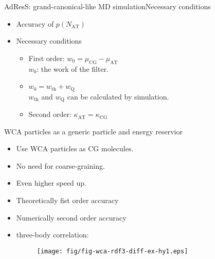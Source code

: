 \documentclass{beamer}
\newcommand{\redc}[1]{{\color{red} #1}}
\newcommand{\bluec}[1]{{\color{blue} #1}}
\newcommand{\AT}{{\textrm{{AT}}}}
\newcommand{\CG}{{\textrm{CG}}}
\newcommand{\thf}{{\textrm{th}}}
\begin{document}
\begin{frame}{AdResS: grand-canonical-like MD simulation}{Necessary conditions}
  \begin{itemize}
    \vfill
  \item<1-> Accuracy of \bluec{$p(N_\AT) $}
    \vfill
  \item<2-> Necessary conditions
    \begin{itemize}
    \vfill
    \item<3-> First order: \redc{$ w_0 = \mu_{\CG} - \mu_{\AT}$}\\
      $w_0$: the work of the filter.
      \vfill
    \item <4-> \redc{$ w_0 = w_\thf + w_{\textrm{Q}}$}\\
      $w_\thf$ and $w_{\textrm{Q}}$ can be calculated by simulation.
    \vfill
    \item<5-> Second order: \redc{$\kappa_\AT = \kappa_{\CG}$}
    \end{itemize}
    \vfill
  \end{itemize}  
\end{frame}




\begin{frame}{WCA particles as a generic particle and energy reservior}
  \begin{itemize}
  \item<1-> Use WCA particles as CG molecules. 
  \item<2-> No need for coarse-graining.
  \item<3-> Even higher speed up.
  \item<4-> Theoretically fist order accuracy
  \item<5-> Numerically second order accuracy
  \item<6-> three-body correlation:
  \begin{figure}
    \centering 
    \texttt{[image: fig/fig-wca-rdf3-diff-ex-hy1.eps]}
  \end{figure}    
  \end{itemize}
\end{frame}
\end{document}
